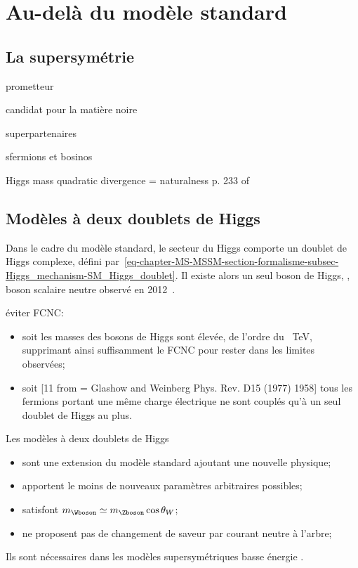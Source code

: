 \section{Au-delà du modèle standard}\label{chapter-MS-MSSM-section-BSM}
\subsection{La supersymétrie}\label{chapter-MS-MSSM-section-BSM-subsec-SUSY}
prometteur

candidat pour la matière noire

superpartenaires

sfermions et bosinos

Higgs mass quadratic divergence = naturalness
p. 233 of~\cite{Higgs_hunter_guide}
\subsection{Modèles à deux doublets de Higgs}\label{chapter-MS-MSSM-section-BSM-subsec-dbl_H_dbl}



Dans le cadre du modèle standard, le secteur du Higgs comporte un doublet de Higgs complexe, défini par~\eqref{eq-chapter-MS-MSSM-section-formalisme-subsec-Higgs_mechanism-SM_Higgs_doublet}.
Il existe alors un seul boson de Higgs, \higgs, boson scalaire neutre observé en 2012~\cite{ATLAS_Higgs_discovery,CMS_Higgs_discovery,CMS_Higgs_discovery_2013,ATLAS-CMS-Higgs_combined_1,ATLAS-CMS-Higgs_combined_2}.



éviter FCNC:
\begin{itemize}
\item soit les masses des bosons de Higgs sont élevée, de l'ordre du \SI{}{\TeV}, supprimant ainsi suffisamment le FCNC pour rester dans les limites observées;
\item soit [11 from \cite{Higgs_hunter_guide} = Glashow and Weinberg Phys. Rev. D15 (1977) 1958] tous les fermions portant une même charge électrique ne sont couplés qu'à un seul doublet de Higgs au plus.
\end{itemize}

Les modèles à deux doublets de Higgs
\begin{itemize}
\item sont une extension du modèle standard ajoutant une nouvelle physique;
\item apportent le moins de nouveaux paramètres arbitraires possibles;
\item satisfont $m_{\Wboson} \simeq m_{\Zboson} \cos\theta_W$;
\item ne proposent pas de changement de saveur par courant neutre à l'arbre;
\end{itemize}
Ils sont nécessaires dans les modèles supersymétriques \og basse énergie \fg{}.


